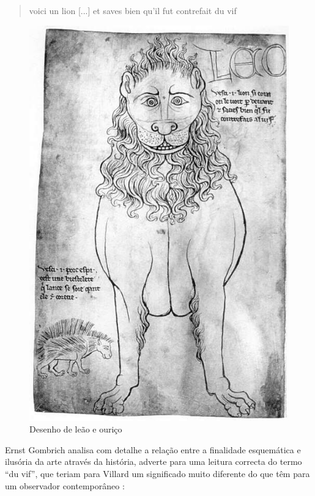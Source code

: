 \documentclass{article}
\begin{document}
\begin{quote}
  voici un lion [...] et saves bien qu'il fut contrefait du vif
\end{quote}

\begin{figure}
\centering\includegraphics[height=0.6\textheight,keepaspectratio]
                          {images/villard-leao.jpg}
  \caption{Desenho de leão e ouriço}
  \label{fig:villard-leao}
\end{figure}

Ernst Gombrich analisa com detalhe a relação entre a finalidade
esquemática e ilusória da arte através da história, adverte para uma
leitura correcta do termo ``du vif'', que teriam para Villard um
significado muito diferente do que têm para um observador
contemporâneo \cite[p. 68]{gombrich}:
\end{document}
